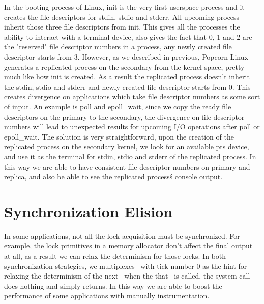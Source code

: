 In the booting process of Linux, init is the very first userspace process and it creates the file descriptors for stdin, stdio and stderr. All upcoming process inherit those three file descriptors from init. This gives all the processes the ability to interact with a terminal device, also gives the fact that 0, 1 and 2 are the "reserved" file descriptor numbers in a process, any newly created file descriptor starts from 3. However, as we described in previous, Popcorn Linux generates a replicated process on the secondary from the kernel space, pretty much like how init is created. As a result the replicated process doesn't inherit the stdin, stdio and stderr and newly created file descriptor starts from 0. This creates divergence on applications which take file descriptor numbers as some sort of input. An example is poll and epoll\_wait, since we copy the ready file descriptors on the primary to the secondary, the divergence on file descriptor numbers will lead to unexpected results for upcoming I/O operations after poll or epoll\_wait. The solution is very straightforward, upon the creation of the replicated process on the secondary kernel, we look for an available pts device, and  use it as the terminal for stdin, stdio and stderr of the replicated process. In this way we are able to have consistent file descriptor numbers on primary and replica, and also be able to see the replicated process\'s console output.

\section{Synchronization Elision} \label{chap:elision}
In some applications, not all the lock acquisition must be synchronized. For example, the lock primitives in a memory allocator don't affect the final output at all, as a result we can relax the determinism for those locks. In both synchronization strategies, we multiplexes \dettick\ with tick number 0 as the hint for relaxing the determinism of the next \detstart\, when the that \detstart\ is called, the system call does nothing and simply returns. In this way we are able to boost the performance of some applications with manually instrumentation.